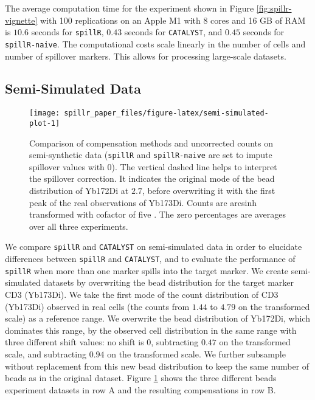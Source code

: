 \documentclass{bioinfo}
\begin{document}
The average computation time for the experiment shown in Figure
\ref{fig:spillr-vignette} with 100 replications on an Apple M1 with 8
cores and 16 GB of RAM is \(10.6\) seconds for \texttt{spillR}, \(0.43\)
seconds for \texttt{CATALYST}, and \(0.45\) seconds for
\texttt{spillR-naive}. The computational costs scale linearly in the
number of cells and number of spillover markers. This allows for
processing large-scale datasets.

\subsection{Semi-Simulated Data}

\label{semi-simulated-data}

\begin{figure}

{\centering \texttt{[image: spillr\_paper\_files/figure-latex/semi-simulated-plot-1]} 

}

\caption{Comparison of compensation methods and uncorrected counts on semi-synthetic data (\texttt{spillR} and \texttt{spillR-naive} are set to impute spillover values with $0$). The vertical dashed line helps to interpret the spillover correction. It indicates the original mode of the bead distribution of Yb172Di at $2.7$, before overwriting it with the first peak of the real observations of Yb173Di. Counts are arcsinh transformed with cofactor of five \citep{bendall2011single}. The zero percentages are averages over all three experiments.}\label{fig:semi-simulated-plot}
\end{figure}

We compare \texttt{spillR} and \texttt{CATALYST} on semi-simulated data
in order to elucidate differences between \texttt{spillR} and
\texttt{CATALYST}, and to evaluate the performance of \texttt{spillR}
when more than one marker spills into the target marker. We create
semi-simulated datasets by overwriting the bead distribution for the
target marker CD3 (Yb173Di). We take the first mode of the count
distribution of CD3 (Yb173Di) observed in real cells (the counts from
\(1.44\) to \(4.79\) on the transformed scale) as a reference range. We
overwrite the bead distribution of Yb172Di, which dominates this range,
by the observed cell distribution in the same range with three different
shift values: no shift is \(0\), subtracting \(0.47\) on the transformed
scale, and subtracting \(0.94\) on the transformed scale. We further
subsample without replacement from this new bead distribution to keep
the same number of beads as in the original dataset. Figure
\ref{fig:semi-simulated-plot} shows the three different beads experiment
datasets in row A and the resulting compensations in row B.
\end{document}
